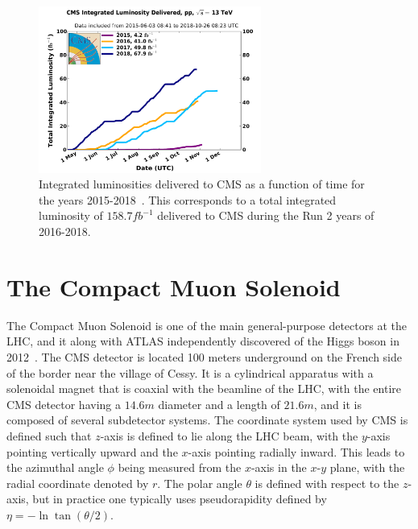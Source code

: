 \begin{figure}[htbp]
  \centering
  \includegraphics[width=0.65\textwidth]{fig/experiment/int_lumi_cumulative_pp_2_run2.pdf}
  \caption[
    Integrated luminosities delivered to CMS as a function of time for the years 2015-2018.
    This corresponds to a total integrated luminosity of $158.7\unit{fb^{-1}}$ delivered to CMS during the Run 2 years of 2016-2018.
  ]{
    Integrated luminosities delivered to CMS as a function of time for the years 2015-2018~\cite{CMSlumi}.
    This corresponds to a total integrated luminosity of $158.7\unit{fb^{-1}}$ delivered to CMS during the Run 2 years of 2016-2018.
  }
  \label{fig:CMSlumi}
\end{figure}

\section{The Compact Muon Solenoid}
\label{sec:CMS}

The Compact Muon Solenoid is one of the main general-purpose detectors at the LHC, and it along with ATLAS independently discovered of the Higgs boson in 2012~\cite{20121,201230}.
The CMS detector is located 100 meters underground on the French side of the border near the village of Cessy.
It is a cylindrical apparatus with a solenoidal magnet that is coaxial with the beamline of the LHC, with the entire CMS detector having a $14.6\unit{m}$ diameter and a length of $21.6\unit{m}$, and it is composed of several subdetector systems.
The coordinate system used by CMS is defined such that $z$-axis is defined to lie along the LHC beam, with the $y$-axis pointing vertically upward and the $x$-axis pointing radially inward.
This leads to the azimuthal angle $\phi$ being measured from the $x$-axis in the $x$-$y$ plane, with the radial coordinate denoted by $r$.
The polar angle $\theta$ is defined with respect to the $z$-axis, but in practice one typically uses pseudorapidity defined by $\eta=-\ln\tan(\theta/2)$.

